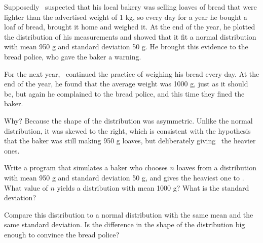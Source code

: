 \documentclass[12pt]{book}
\begin{document}

Supposedly \Poincare~suspected that his local bakery was selling
loaves of bread that were lighter than the advertised weight of 1 kg,
so every day for a year he bought a loaf of bread, brought it home and
weighed it.  At the end of the year, he plotted the distribution of
his measurements and showed that it fit a normal distribution with
mean 950 g and standard deviation 50 g.  He brought this evidence to
the bread police, who gave the baker a warning.


For the next year, \Poincare~continued the practice of weighing his
bread every day.  At the end of the year, he found that the average
weight was 1000 g, just as it should be, but again he complained to
the bread police, and this time they fined the baker.


Why?  Because the shape of the distribution was asymmetric.  Unlike
the normal distribution, it was skewed to the right, which is
consistent with the hypothesis that the baker was still making 950 g
loaves, but deliberately giving \Poincare~the heavier ones.


\begin{ex}

Write a program that simulates a baker who chooses $n$ loaves from a
distribution with mean 950 g and standard deviation 50 g, and gives
the heaviest one to \Poincare.  What value of $n$ yields a
distribution with mean 1000 g?  What is the standard deviation?

Compare this distribution to a normal distribution with the same mean
and the same standard deviation.  Is the difference in the shape of
the distribution big enough to convince the bread police?

\end{ex}
\end{document}
